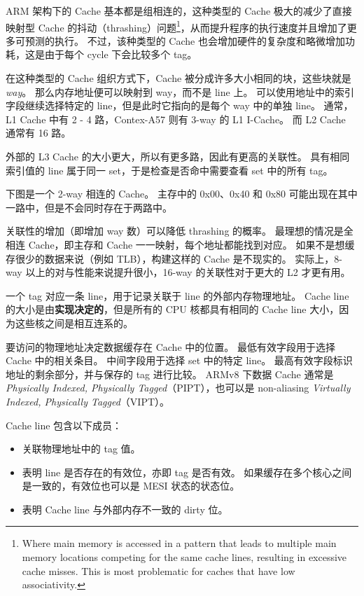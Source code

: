 
ARM 架构下的 Cache 基本都是组相连的，这种类型的 Cache 极大的减少了直接映射型 Cache 的抖动（thrashing）问题\footnote{
Where main memory is accessed in a pattern that leads to multiple main memory locations competing for the same cache lines, resulting in excessive cache misses.
This is most problematic for caches that have low associativity.
 }，从而提升程序的执行速度并且增加了更多可预测的执行。
不过，该种类型的 Cache 也会增加硬件的复杂度和略微增加功耗，这是由于每个 cycle 下会比较多个 tag。

在这种类型的 Cache 组织方式下，Cache 被分成许多大小相同的块，这些块就是 \textit{way}。
那么内存地址便可以映射到 way，而不是 line 上。
可以使用地址中的索引字段继续选择特定的 line，但是此时它指向的是每个 way 中的单独 line。
通常，L1 Cache 中有 2 - 4 路，Contex-A57 则有 3-way 的 L1 I-Cache。
而 L2 Cache 通常有 16 路。

外部的 L3 Cache 的大小更大，所以有更多路，因此有更高的关联性。
具有相同索引值的 line 属于同一 set，于是检查是否命中需要查看 set 中的所有 tag。

下图是一个 2-way 相连的 Cache。
主存中的 0x00、0x40 和 0x80 可能出现在其中一路中，但是不会同时存在于两路中。


关联性的增加（即增加 way 数）可以降低 thrashing 的概率。
最理想的情况是全相连 Cache，即主存和 Cache 一一映射，每个地址都能找到对应。
如果不是想缓存很少的数据来说（例如 TLB），构建这样的 Cache 是不现实的。
实际上，8-way 以上的对与性能来说提升很小，16-way 的关联性对于更大的 L2 才更有用。


一个 tag 对应一条 line，用于记录关联于 line 的外部内存物理地址。
Cache line 的大小是由\textbf{实现决定的}，但是所有的 CPU 核都具有相同的 Cache line 大小，因为这些核之间是相互连系的。

要访问的物理地址决定数据缓存在 Cache 中的位置。
最低有效字段用于选择 Cache 中的相关条目。
中间字段用于选择 set 中的特定 line。
最高有效字段标识地址的剩余部分，并与保存的 tag 进行比较。
ARMv8 下数据 Cache 通常是 \textit{Physically Indexed, Physically Tagged}（PIPT），也可以是 non-aliasing \textit{Virtually Indexed, Physically Tagged}（VIPT）。

Cache line 包含以下成员：

\begin{itemize}
  \item 关联物理地址中的 tag 值。
  \item 表明 line 是否存在的有效位，亦即 tag 是否有效。
    如果缓存在多个核心之间是一致的，有效位也可以是 MESI 状态的状态位。
  \item 表明 Cache line 与外部内存不一致的 dirty 位。
\end{itemize}

